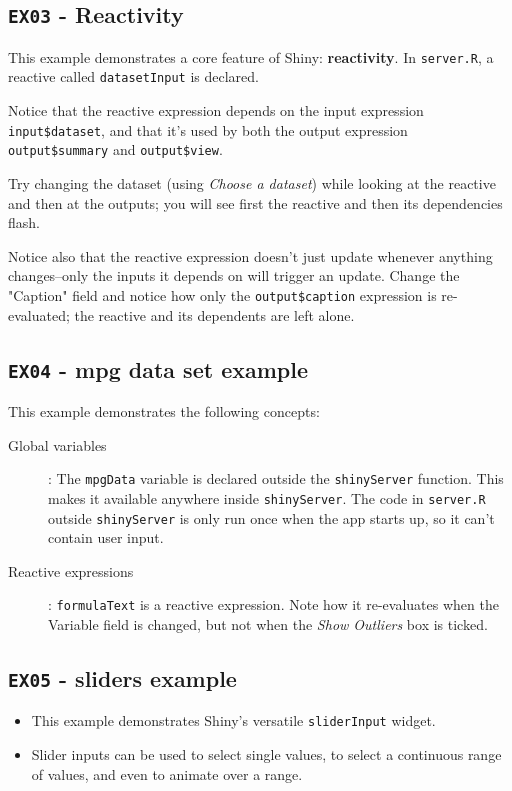 \documentclass[12pt]{article}
\begin{document}
\subsection{\texttt{EX03} - Reactivity}
This example demonstrates a core feature of Shiny: \textbf{reactivity}. In \texttt{server.R}, a reactive called \texttt{datasetInput} is declared.
\newline

\noindent Notice that the reactive expression depends on the input expression \texttt{input\$dataset}, and that it's used by both the output expression \texttt{output\$summary} and \texttt{output\$view}. 
\newline

\noindent Try changing the dataset (using \textit{Choose a dataset}) while looking at the reactive and then at the outputs; you will see first the reactive and then its dependencies flash.
\newline

\noindent Notice also that the reactive expression doesn't just update whenever anything changes--only the inputs it depends on will trigger an update. Change the "Caption" field and notice how only the \texttt{output\$caption} expression is re-evaluated; the reactive and its dependents are left alone.
\newpage
\subsection{\texttt{EX04} - mpg data set example}
This example demonstrates the following concepts:

\begin{description}
\item[Global variables]: The \texttt{mpgData} variable is declared outside the \texttt{shinyServer} function. This makes it available anywhere inside \texttt{shinyServer}. The code in \texttt{server.R} outside \texttt{shinyServer} is only run once when the app starts up, so it can't contain user input.

\item[Reactive expressions]: \texttt{formulaText} is a reactive expression. Note how it re-evaluates when the Variable field is changed, but not when the \textit{Show Outliers} box is ticked.
\end{description}
\subsection{\texttt{EX05} - sliders example}
\begin{itemize}
\item This example demonstrates Shiny's versatile \texttt{sliderInput} widget.

\item 
Slider inputs can be used to select single values, to select a continuous range of values, and even to animate over a range.
\end{itemize}
\end{document}
